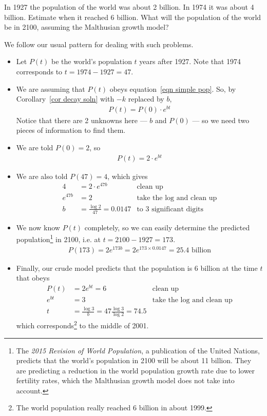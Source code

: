 \begin{eg}\label{eg:SDEpopgthA}
In 1927 the population of the world was about 2 billion.
In 1974 it was about 4 billion. Estimate when it reached
6 billion. What will the population of the world be in 2100,
assuming the Malthusian growth model?

 \soln We follow our usual pattern for dealing with such problems.
 \begin{itemize}
 \item Let $P(t)$ be the world's population $t$ years after 1927.
Note that 1974 corresponds to $t=1974-1927 = 47$.

 \item We are assuming that $P(t)$ obeys equation~\eqref{eqn simple pop}. So,
by Corollary~\ref{cor decay soln} with $-k$ replaced by $b$,
 \begin{align*}
           P(t)=P(0)\cdot e^{bt}
 \end{align*}
 Notice that there are 2 unknowns here --- $b$ and $P(0)$
  --- so we need two pieces of information to find them.

 \item We are told $P(0)=2$, so
 \begin{align*}
   P(t)=2\cdot e^{bt}
 \end{align*}
 \item We are also told $P(47)=4$, which gives
 \begin{align*}
   4 &=2\cdot e^{47b} & \text{clean up}\\
   e^{47b}&=2 & \text{take the log and clean up}\\
   b&=\frac{\log 2}{47} = 0.0147 & \text{to 3 significant digits}
 \end{align*}
 \item We now know $P(t)$ completely, so we can easily determine
the predicted population\footnote{The \emph{2015 Revision of
World Population}, a publication of the United Nations, predicts
that the world's population in 2100 will be about 11 billion.
They are predicting a reduction in the world population growth rate due to
lower fertility rates, which the Malthusian growth model does not take
into account.} in 2100,
i.e. at $t=2100-1927 = 173$.
 \begin{align*}
   P(173) = 2 e^{173 b} = 2 e^{173\times 0.0147} = 25.4\text{ billion}
 \end{align*}

\item Finally, our crude model predicts that the population is
6 billion at the time $t$ that obeys
 \begin{align*}
   P(t) &= 2 e^{b t} = 6 & \text{clean up}\\
   e^{b t}&=3 & \text{take the log and clean up}\\
   t&=\frac{\log 3}{b} = 47\frac{\log 3}{\log 2}
                       = 74.5
 \end{align*}
which corresponds\footnote{The world population really reached
6 billion in about 1999.}  to the middle of 2001.
\end{itemize}
\end{eg}
